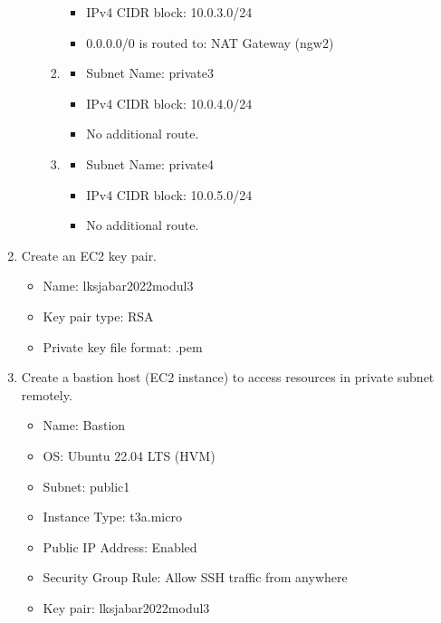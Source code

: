 \documentclass{article}
\begin{document}
\begin{enumerate}
\begin{itemize}
\begin{enumerate}
\begin{itemize}
                \item IPv4 CIDR block: 10.0.3.0/24
                \item 0.0.0.0/0 is routed to: NAT Gateway (ngw2) 
            \end{itemize}
            \vspace{5mm} 
            \item 
            \begin{itemize}
                \item Subnet Name: private3
                \item IPv4 CIDR block: 10.0.4.0/24
                \item No additional route.
            \end{itemize}
            \vspace{5mm} 
            \item 
            \begin{itemize}
                \item Subnet Name: private4
                \item IPv4 CIDR block: 10.0.5.0/24
                \item No additional route.
            \end{itemize}
        \end{enumerate}
    \end{itemize}
    \item Create an EC2 key pair.
    \begin{itemize}
        \item Name: lksjabar2022modul3
        \item Key pair type: RSA
        \item Private key file format: .pem
    \end{itemize}
    \item Create a bastion host (EC2 instance) to access resources in private subnet remotely.
        \begin{itemize}
            \item Name: Bastion
            \item OS: Ubuntu 22.04 LTS (HVM)
            \item Subnet: public1
            \item Instance Type: t3a.micro
            \item Public IP Address: Enabled
            \item Security Group Rule: Allow SSH traffic from anywhere
            \item Key pair: lksjabar2022modul3

\end{itemize}
\end{enumerate}
\end{document}
